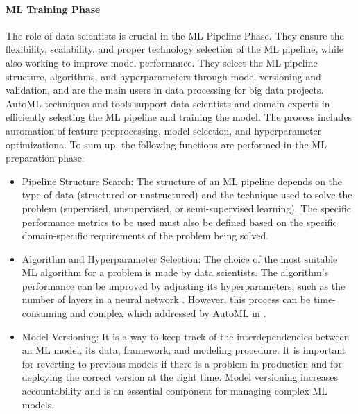 \documentclass[conference]{IEEEtran}
\begin{document}
\paragraph{ML Training Phase}
The role of data scientists is crucial in the ML Pipeline Phase. They ensure the flexibility, scalability, and proper technology selection of the ML pipeline, while also working to improve model performance. They select the ML pipeline structure, algorithms, and hyperparameters through model versioning and validation, and are the main users in data processing for big data projects. AutoML techniques \cite{automl} and tools support data scientists and domain experts in efficiently selecting the ML pipeline and training the model. The process includes automation of feature preprocessing, model selection, and hyperparameter optimizationa. To sum up, the following functions are performed in the ML preparation phase:
\begin{itemize}
	\item Pipeline Structure Search: The structure of an ML pipeline depends on the type of data (structured or unstructured) and the technique used to solve the problem (supervised, unsupervised, or semi-supervised learning). The specific performance metrics to be used must also be defined based on the specific domain-specific requirements of the problem being solved.
	\item Algorithm and Hyperparameter Selection: The choice of the most suitable ML algorithm for a problem is made by data scientists. The algorithm's performance can be improved by adjusting its hyperparameters, such as the number of layers in a neural network \cite{kisskalt2020streamlining}. However, this process can be time-consuming and complex which addressed by AutoML in \cite{automl}.
	\item Model Versioning: It is a way to keep track of the interdependencies between an ML model, its data, framework, and modeling procedure. It is important for reverting to previous models if there is a problem in production and for deploying the correct version at the right time. Model versioning increases accountability and is an essential component for managing complex ML models.
\end{itemize}
\end{document}
